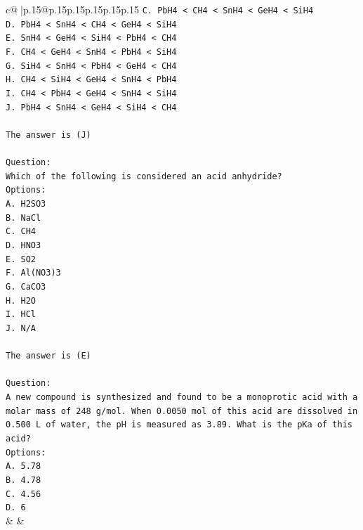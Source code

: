 \documentclass{article}
\begin{document}
{\begin{supertabular}{c@{$\;$}|p{.15\linewidth}@{}p{.15\linewidth}p{.15\linewidth}p{.15\linewidth}p{.15\linewidth}p{.15\linewidth}}
{{{\texttt{C. PbH4 < CH4 < SnH4 < GeH4 < SiH4} \\
\texttt{D. PbH4 < SnH4 < CH4 < GeH4 < SiH4} \\
\texttt{E. SnH4 < GeH4 < SiH4 < PbH4 < CH4} \\
\texttt{F. CH4 < GeH4 < SnH4 < PbH4 < SiH4} \\
\texttt{G. SiH4 < SnH4 < PbH4 < GeH4 < CH4} \\
\texttt{H. CH4 < SiH4 < GeH4 < SnH4 < PbH4} \\
\texttt{I. CH4 < PbH4 < GeH4 < SnH4 < SiH4} \\
\texttt{J. PbH4 < SnH4 < GeH4 < SiH4 < CH4} \\
\\ 
\texttt{The answer is (J)} \\
\\ 
\texttt{Question:} \\
\texttt{Which of the following is considered an acid anhydride?} \\
\texttt{Options:} \\
\texttt{A. H2SO3} \\
\texttt{B. NaCl} \\
\texttt{C. CH4} \\
\texttt{D. HNO3} \\
\texttt{E. SO2} \\
\texttt{F. Al(NO3)3} \\
\texttt{G. CaCO3} \\
\texttt{H. H2O} \\
\texttt{I. HCl} \\
\texttt{J. N/A} \\
\\ 
\texttt{The answer is (E)} \\
\\ 
\texttt{Question:} \\
\texttt{A new compound is synthesized and found to be a monoprotic acid with a molar mass of 248 g/mol. When 0.0050 mol of this acid are dissolved in 0.500 L of water, the pH is measured as 3.89. What is the pKa of this acid?} \\
\texttt{Options:} \\
\texttt{A. 5.78} \\
\texttt{B. 4.78} \\
\texttt{C. 4.56} \\
\texttt{D. 6} \\
            }
        }
    }
    & & \\ \\


\end{supertabular}}
\end{document}
